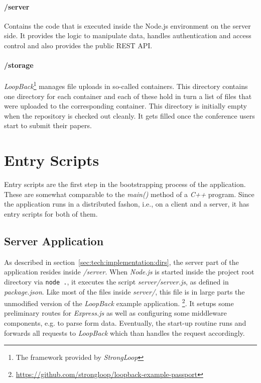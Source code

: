 \documentclass[nochapterpage,nopartpage,noheadingspace,numbersubsubsec,bigchapter,colorback,accentcolor=tud9c,10pt]{tudreport}
\begin{document}
  \paragraph{/server}
    Contains the code that is executed inside the Node.js environment on the server side. It provides the logic to manipulate data, handles authentication and access control and also provides the public REST API.

  \paragraph{/storage}
    \emph{LoopBack}\footnote{The framework provided by \emph{StrongLoop}} manages file uploads in so-called containers. This directory contains one directory for each container and each of these hold in turn a list of files that were uploaded to the corresponding container. This directory is initially empty when the repository is checked out cleanly. It gets filled once the conference users start to submit their papers.

  \section{Entry Scripts}
  \label{sec:tech:implementation:bootstrapping}

    Entry scripts are the first step in the bootstrapping process of the application. These are somewhat comparable to the \emph{main()} method of a \emph{C++} program. Since the application runs in a distributed fashon, i.e., on a client and a server, it has entry scripts for both of them.

  \subsection{Server Application}
  \label{sec:tech:implementation:bootstrapping:server}

    As described in section~\ref{sec:tech:implementation:dirs}, the server part of the application resides inside \emph{/server}. When \emph{Node.js} is started inside the project root directory via \texttt{node .}, it executes the script \emph{server/server.js}, as defined in \emph{package.json}. Like most of the files inside \emph{server/}, this file is in large parts the unmodified version of the \emph{LoopBack} example application.%
    \footnote{\url{https://github.com/strongloop/loopback-example-passport}}. It setups some preliminary routes for \emph{Express.js} as well as configuring some middleware components, e.g. to parse form data. Eventually, the start-up routine runs and forwards all requests to \emph{LoopBack} which than handles the request accordingly.
\end{document}

